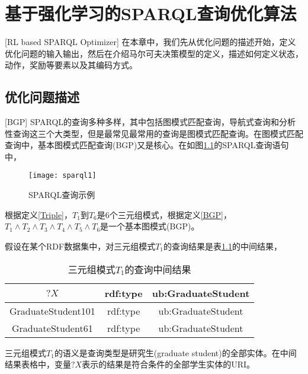 \chapter{基于强化学习的SPARQL查询优化算法}[RL based SPARQL Optimizer]
在本章中，我们先从优化问题的描述开始，定义优化问题的输入输出，然后在介绍马尔可夫决策模型的定义，描述如何定义状态，动作，奖励等要素以及其编码方式。

\section{优化问题描述}[BGP]
SPARQL的查询多种多样，其中包括图模式匹配查询，导航式查询和分析性查询这三个大类型，但是最常见最常用的查询是图模式匹配查询。在图模式匹配查询中，基本图模式匹配查询(BGP)又是核心。在如图\ref{sparql1}的SPARQL查询语句中，
\begin{figure}[h]
    \centering
    \texttt{[image: sparql1]}
    \caption{SPARQL查询示例}
    \label{sparql1}
\end{figure}
根据定义\ref{Triple}，$T_1$到$T_6$是6个三元组模式，根据定义\ref{BGP}，$T_1\wedge T_2\wedge T_3\wedge T_4\wedge T_5\wedge T_6$是一个基本图模式(BGP)。

假设在某个RDF数据集中，对三元组模式$T_1$的查询结果是表\ref{T1}的中间结果，
\begin{table}[htbp]
    \caption[table1]{三元组模式$T_1$的查询中间结果}
    \label{T1}
    \vspace{0.5em}\centering\wuhao
    \begin{tabular}{|c|c|c|}
    \toprule[1.5pt]
    $?X$ & rdf:type & ub:GraduateStudent\\
    \midrule[1pt]
    GraduateStudent101 & rdf:type & ub:GraduateStudent\\
    GraduateStudent61 & rdf:type &ub:GraduateStudent\\
    \bottomrule[1.5pt]
    \end{tabular}
\end{table}
三元组模式$T_1$的语义是查询类型是研究生(graduate student)的全部实体。在中间结果表格中，变量$?X$表示的结果是符合条件的全部学生实体的URI。

